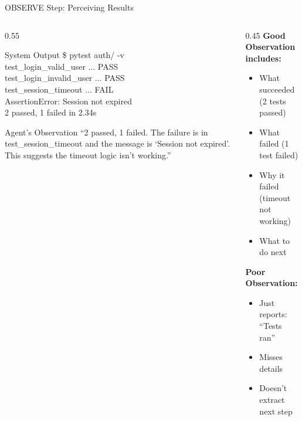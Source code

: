 \documentclass[aspectratio=169, 11pt]{beamer}
\begin{document}
\begin{frame}{OBSERVE Step: Perceiving Results}
    \begin{columns}[T]
        \begin{column}{0.55\textwidth}
            \begin{block}{System Output}
                \ttfamily\footnotesize
                \$ pytest auth/ -v\\[0.2cm]
                test\_login\_valid\_user ... PASS\\
                test\_login\_invalid\_user ... PASS\\
                test\_session\_timeout ... FAIL\\
                \quad AssertionError: Session not expired\\[0.2cm]
                2 passed, 1 failed in 2.34s
            \end{block}

            \vspace{0.3cm}
            \begin{exampleblock}{Agent's Observation}
                \footnotesize
                ``2 passed, 1 failed. The failure is in test\_session\_timeout and the message is `Session not expired'. This suggests the timeout logic isn't working.''
            \end{exampleblock}
        \end{column}
        \begin{column}{0.45\textwidth}
            \textbf{Good Observation includes:}
            \begin{itemize}
                \item[\textcolor{UofSCHorseshoe}{\checkmark}] What succeeded (2 tests passed)
                \item[\textcolor{UofSCHorseshoe}{\checkmark}] What failed (1 test failed)
                \item[\textcolor{UofSCHorseshoe}{\checkmark}] Why it failed (timeout not working)
                \item[\textcolor{UofSCHorseshoe}{\checkmark}] What to do next
            \end{itemize}

            \vspace{0.3cm}
            \textbf{Poor Observation:}
            \begin{itemize}
                \item[\textcolor{UofSCRose}{$\times$}] Just reports: ``Tests ran''
                \item[\textcolor{UofSCRose}{$\times$}] Misses details
                \item[\textcolor{UofSCRose}{$\times$}] Doesn't extract next step
            \end{itemize}
        \end{column}
    \end{columns}

\end{frame}
\end{document}
